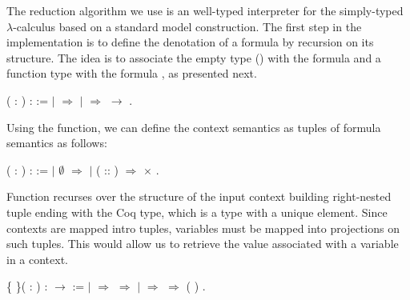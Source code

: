 The reduction algorithm we use is an well-typed interpreter for the simply-typed $\lambda$-calculus based on a
standard model construction. The first step in the implementation is to define the denotation of a formula by
recursion on its structure. The idea is to associate the empty type () with the formula  and a
function type with the formula   , as presented next.
 \begin{coqdoccode}
\coqdocemptyline
\coqdocemptyline
\coqdocnoindent
{}  ( : \coqdocvar{$\alpha$}) :  :=\coqdoceol
\coqdocindent{1.00em}
  \coqdoceol
\coqdocindent{1.00em}
\ensuremath{|}  \ensuremath{\Rightarrow} \coqdoceol
\coqdocindent{1.00em}
\ensuremath{|}    \ensuremath{\Rightarrow}   \ensuremath{\rightarrow}  \coqdoceol
\coqdocindent{1.00em}
.\coqdoceol
\coqdocemptyline
\end{coqdoccode}
Using the  function, we can define the context semantics as tuples
of formula semantics as follows:
 \begin{coqdoccode}
\coqdocemptyline
\coqdocnoindent
{}  ( : \coqdocvar{$\Gamma$}) :  :=\coqdoceol
\coqdocindent{1.00em}
  \coqdoceol
\coqdocindent{1.00em}
\ensuremath{|} $\emptyset$ \ensuremath{\Rightarrow} \coqdoceol
\coqdocindent{1.00em}
\ensuremath{|} ( :: ) \ensuremath{\Rightarrow}   \ensuremath{\times}  \coqdoceol
\coqdocindent{1.00em}
.\coqdoceol
\end{coqdoccode}
Function  recurses over the structure of the input context building
right-nested tuple ending with the Coq  type, which is a type with a
unique element. Since contexts are mapped intro tuples, variables must be
mapped into projections on such tuples. This would allow us to retrieve the
value associated with a variable in a context.
\begin{coqdoccode}
\coqdocemptyline
\coqdocnoindent
{}  \{ \}( :   )\coqdoceol
\coqdocindent{1.00em}
:   \ensuremath{\rightarrow}   :=\coqdoceol
\coqdocindent{2.00em}
  \coqdoceol
\coqdocindent{2.00em}
\ensuremath{|}  \ensuremath{\Rightarrow}   \ensuremath{\Rightarrow}  \coqdoceol
\coqdocindent{2.00em}
\ensuremath{|}   \ensuremath{\Rightarrow}   \ensuremath{\Rightarrow}   ( )\coqdoceol
\coqdocindent{2.00em}
.\coqdoceol
\coqdocemptyline
\end{coqdoccode}
